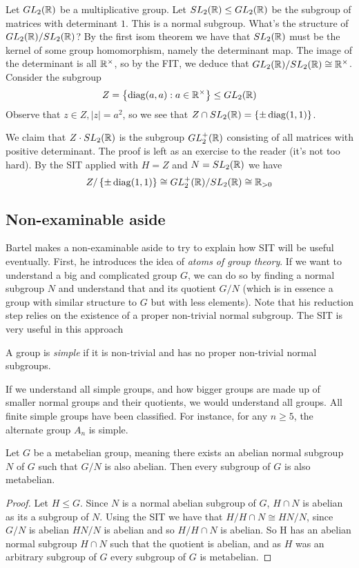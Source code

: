 \begin{example}
  Let $GL_2(\mathbb R)$ be a multiplicative group. Let $SL_2(\mathbb R)\leq GL_2(\mathbb R)$ be the subgroup
  of matrices with determinant $1$. This is a normal subgroup. What's the structure of
  $GL_2(\mathbb R)/SL_2(\mathbb R)$? By the first isom theorem we have that $SL_2(\mathbb R)$ must be the
  kernel of some group homomorphism, namely the determinant map. The image of the
  determinant is all $\mathbb R^{\times}$, so by the FIT, we deduce that
  $GL_2(\mathbb R)/SL_2(\mathbb R)\cong \mathbb R^{\times}$. Consider the subgroup
  \[Z= \left\{ \operatorname*{diag} (a,a) : a\in \mathbb R^{\times} \right\} \leq GL_{2}(\mathbb R)\]
  Observe that $z\in Z, |z|=a^2$, so we see that $Z\cap SL_{2}(\mathbb R) = \left\{ \pm
  \operatorname*{diag}(1,1) \right\}$. 

  We claim that $Z\cdot SL_2(\mathbb R)$ is the subgroup $GL_2^+(\mathbb R)$
  consisting of all matrices with positive determinant. The proof is left as an exercise
  to the reader (it's not too hard). By the SIT applied with $H=Z$ and $N=SL_2(\mathbb R)$ we
  have
  \[ Z/\left\{ \pm \operatorname*{diag}(1,1) \right\} \cong GL_2^+(\mathbb R)/ SL_2(\mathbb R) \cong \mathbb R_{>0}\]

\end{example}

\subsection{Non-examinable aside}
Bartel makes a non-examinable aside to try to explain how SIT will be useful eventually.
First, he introduces the idea of \emph{atoms of group theory}. If we want to understand a
big and complicated group $G$, we can do so by finding a normal subgroup $N$ and
understand that and its quotient $G/N$ (which is in essence a group with similar structure
to $G$ but with less elements). Note that his reduction step relies on the existence of a
proper non-trivial normal subgroup. The SIT is very useful in this approach
\begin{definition}
  A group is \emph{simple} if it is non-trivial and has no proper non-trivial normal
  subgroups.
\end{definition}

If we understand all simple groups, and how bigger groups are made up of smaller normal
groups and their quotients, we would understand all groups. All finite simple groups have
been classified. For instance, for any $n\geq 5$, the alternate group $A_n$ is simple.

\begin{theorem}
  Let $G$ be a metabelian group, meaning there exists an abelian normal subgroup $N$ of
  $G$ such that $G/N$ is also abelian. Then every subgroup of $G$ is also metabelian.
  \label{<+label+>}
\end{theorem}

\begin{proof}
    Let $H \leq G$. Since $N$ is a normal abelian subgroup of $G$, $H \cap N$ is abelian as its a subgroup of $N$. Using the SIT we have that $H/H \cap N \cong HN/N$, since $G/N$ is abelian $HN/N$ is abelian and so $H/H \cap N$ is abelian. So H has an abelian normal subgroup $H \cap N$ such that the quotient is abelian, and as $H$ was an arbitrary subgroup of $G$ every subgroup of $G$ is metabelian.
\end{proof}

